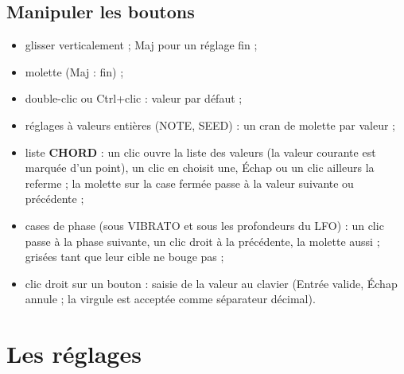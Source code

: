 \documentclass[a4paper,11pt]{article}
\newcommand{\ctl}[1]{\textsf{\textbf{#1}}}   %
\begin{document}
\subsection{Manipuler les boutons}
\begin{itemize}
\item glisser verticalement ; \textsf{Maj} pour un réglage fin ;
\item molette (\textsf{Maj} : fin) ;
\item double-clic ou \textsf{Ctrl}+clic : valeur par défaut ;
\item réglages à valeurs entières (NOTE, SEED) : un cran de molette par valeur ;
\item liste \ctl{CHORD} : un clic ouvre la liste des valeurs (la valeur courante est
  marquée d'un point), un clic en choisit une, \textsf{Échap} ou un clic ailleurs la referme ; la
  molette sur la case fermée passe à la valeur suivante ou précédente ;
\item cases de phase (sous VIBRATO et sous les profondeurs du LFO) : un clic passe à la phase
  suivante, un clic droit à la précédente, la molette aussi ; grisées tant que leur cible ne bouge
  pas ;
\item clic droit sur un bouton : saisie de la valeur au clavier (\textsf{Entrée} valide, \textsf{Échap}
  annule ; la virgule est acceptée comme séparateur décimal).
\end{itemize}

\section{Les réglages}
\end{document}
